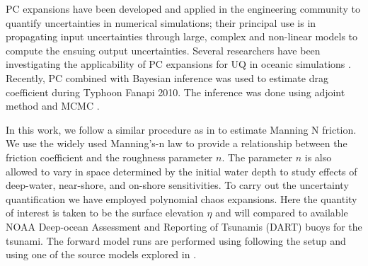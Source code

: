 PC expansions have been developed and applied in the engineering community to quantify uncertainties
in numerical simulations; their principal use is in propagating input
uncertainties through large, complex and non-linear models to compute the
ensuing output uncertainties. Several researchers have been 
investigating the applicability of PC expansions for UQ in oceanic simulations
\citep{thacker2012,ashwanth2010,Alexanderian2012}. Recently,
PC combined with Bayesian inference was used to estimate drag coefficient
during Typhoon Fanapi 2010. The inference was done using
adjoint method and MCMC \cite{sraj:2013a,sraj:2013b}.

In this work, we follow a similar procedure as in \cite{sraj:2013a,sraj:2013b}
to estimate Manning N friction. We use the widely used Manning's-n law to provide a relationship between the friction coefficient and the roughness parameter $n$.  The parameter $n$ is also allowed to vary in space determined by the initial water depth to study effects of deep-water, near-shore, and on-shore sensitivities.  To carry out the uncertainty quantification we have employed polynomial chaos expansions.  Here the quantity of interest is taken to be the surface elevation $\eta$ and will compared to available NOAA Deep-ocean Assessment and Reporting of Tsunamis (DART) buoys for the \tohoku tsunami.  The forward model runs are performed using \geoclaw following the setup and using one of the source models explored in \cite{MacInnes:2013cr}.

